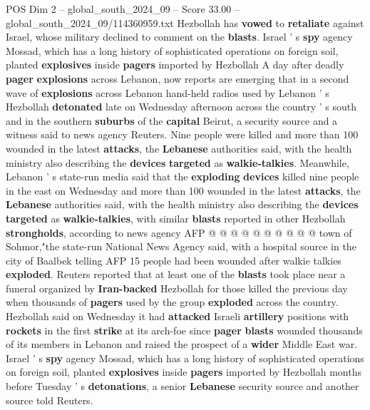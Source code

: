 \begin{textsample}{POS Dim 2 – global\_south\_2024\_09 – Score 33.00 – global\_south\_2024\_09/114360959.txt}  \label{ex:f2_pos_035}
Hezbollah has \textbf{vowed} to \textbf{retaliate} against Israel, whose military declined to comment on the \textbf{blasts}.
Israel ' s \textbf{spy} agency Mossad, which has a long history of sophisticated operations on foreign soil, planted \textbf{explosives} inside \textbf{pagers} imported by Hezbollah A day after deadly \textbf{pager} \textbf{explosions} across Lebanon, now reports are emerging that in a second wave of \textbf{explosions} across Lebanon hand-held radios used by Lebanon ' s Hezbollah \textbf{detonated} late on Wednesday afternoon across the country ' s south and in the southern \textbf{suburbs} of the \textbf{capital} Beirut, a security source and a witness said to news agency Reuters.
Nine people were killed and more than 100 wounded in the latest \textbf{attacks}, the \textbf{Lebanese} authorities said, with the health ministry also describing the \textbf{devices} \textbf{targeted} as \textbf{walkie-talkies}.
Meanwhile, Lebanon ' s state-run media said that the \textbf{exploding} \textbf{devices} killed nine people in the east on Wednesday and more than 100 wounded in the latest \textbf{attacks}, the \textbf{Lebanese} authorities said, with the health ministry also describing the \textbf{devices} \textbf{targeted} as \textbf{walkie-talkies}, with similar \textbf{blasts} reported in other Hezbollah \textbf{strongholds}, according to news agency AFP @ @ @ @ @ @ @ @ @ @ town of Sohmor,"the state-run National News Agency said, with a hospital source in the city of Baalbek telling AFP 15 people had been wounded after walkie talkies \textbf{exploded}.
Reuters reported that at least one of the \textbf{blasts} took place near a funeral organized by \textbf{Iran-backed} Hezbollah for those killed the previous day when thousands of \textbf{pagers} used by the group \textbf{exploded} across the country.
Hezbollah said on Wednesday it had \textbf{attacked} Israeli \textbf{artillery} positions with \textbf{rockets} in the first \textbf{strike} at its arch-foe since \textbf{pager} \textbf{blasts} wounded thousands of its members in Lebanon and raised the prospect of a \textbf{wider} Middle East war.
Israel ' s \textbf{spy} agency Mossad, which has a long history of sophisticated operations on foreign soil, planted \textbf{explosives} inside \textbf{pagers} imported by Hezbollah months before Tuesday ' s \textbf{detonations}, a senior \textbf{Lebanese} security source and another source told Reuters.

\end{textsample}
